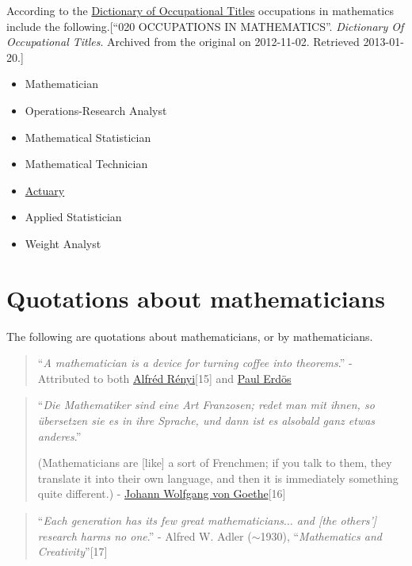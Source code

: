 \documentclass{book}
\numberwithin{equation}{section}
\begin{document}
According to the \href{https://en.wikipedia.org/wiki/Dictionary_of_Occupational_Titles}{Dictionary of Occupational Titles} occupations in mathematics include the following.[``020 OCCUPATIONS IN MATHEMATICS''. \textit{Dictionary Of Occupational Titles}. Archived from the original on 2012-11-02. Retrieved 2013-01-20.]
\begin{itemize}
    \item Mathematician
    \item Operations-Research Analyst
    \item Mathematical Statistician
    \item Mathematical Technician
    \item \href{https://en.wikipedia.org/wiki/Actuary}{Actuary}
    \item Applied Statistician
    \item Weight Analyst
\end{itemize}

\section{Quotations about mathematicians}
The following are quotations about mathematicians, or by mathematicians.
\begin{quotation}
    ``\textit{A mathematician is a device for turning coffee into theorems}.'' - Attributed to both \href{https://en.wikipedia.org/wiki/Alfr%C3%A9d_R%C3%A9nyi}{Alfréd Rényi}[15] and \href{https://en.wikipedia.org/wiki/Paul_Erd%C5%91s}{Paul Erd\"os}
\end{quotation}

\begin{quotation}
    ``\textit{Die Mathematiker sind eine Art Franzosen; redet man mit ihnen, so übersetzen sie es in ihre Sprache, und dann ist es alsobald ganz etwas anderes}.''
    
    (Mathematicians are [like] a sort of Frenchmen; if you talk to them, they translate it into their own language, and then it is immediately something quite different.) - \href{https://en.wikipedia.org/wiki/Johann_Wolfgang_von_Goethe}{Johann Wolfgang von Goethe}[16]
\end{quotation}

\begin{quotation}
    ``\textit{Each generation has its few great mathematicians$\ldots$ and [the others'] research harms no one}.'' - Alfred W. Adler ($\sim$1930), ``\textit{Mathematics and Creativity}''[17]
\end{quotation}
\end{document}

